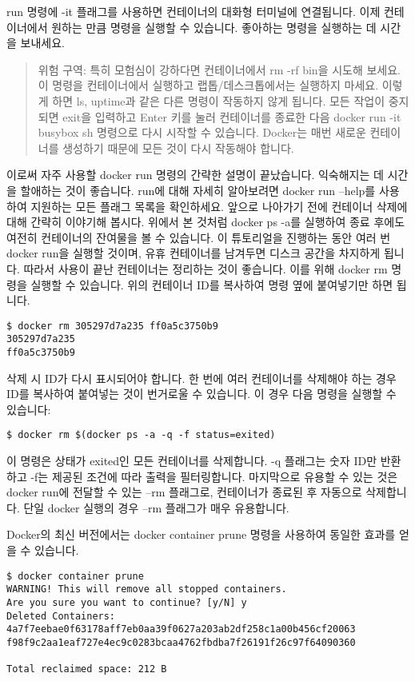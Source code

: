 run 명령에 -it 플래그를 사용하면 컨테이너의 대화형 터미널에 연결됩니다. 이제 컨테이너에서 원하는 만큼 명령을 실행할 수 있습니다. 좋아하는 명령을 실행하는 데 시간을 보내세요.
\begin{quote}
위험 구역: 특히 모험심이 강하다면 컨테이너에서 rm -rf bin을 시도해 보세요. 이 명령을 컨테이너에서 실행하고 랩톱/데스크톱에서는 실행하지 마세요. 이렇게 하면 ls, uptime과 같은 다른 명령이 작동하지 않게 됩니다. 모든 작업이 중지되면 exit을 입력하고 Enter 키를 눌러 컨테이너를 종료한 다음 docker run -it busybox sh 명령으로 다시 시작할 수 있습니다. Docker는 매번 새로운 컨테이너를 생성하기 때문에 모든 것이 다시 작동해야 합니다.
\end{quote}

이로써 자주 사용할 docker run 명령의 간략한 설명이 끝났습니다. 익숙해지는 데 시간을 할애하는 것이 좋습니다. run에 대해 자세히 알아보려면 docker run --help를 사용하여 지원하는 모든 플래그 목록을 확인하세요. 앞으로 나아가기 전에 컨테이너 삭제에 대해 간략히 이야기해 봅시다. 위에서 본 것처럼 docker ps -a를 실행하여 종료 후에도 여전히 컨테이너의 잔여물을 볼 수 있습니다. 이 튜토리얼을 진행하는 동안 여러 번 docker run을 실행할 것이며, 유휴 컨테이너를 남겨두면 디스크 공간을 차지하게 됩니다. 따라서 사용이 끝난 컨테이너는 정리하는 것이 좋습니다. 이를 위해 docker rm 명령을 실행할 수 있습니다. 위의 컨테이너 ID를 복사하여 명령 옆에 붙여넣기만 하면 됩니다.
\begin{lstlisting}[language=Shell]
$ docker rm 305297d7a235 ff0a5c3750b9
305297d7a235
ff0a5c3750b9
\end{lstlisting}

삭제 시 ID가 다시 표시되어야 합니다. 한 번에 여러 컨테이너를 삭제해야 하는 경우 ID를 복사하여 붙여넣는 것이 번거로울 수 있습니다. 이 경우 다음 명령을 실행할 수 있습니다:
\begin{lstlisting}[language=Shell]
$ docker rm $(docker ps -a -q -f status=exited)
\end{lstlisting}

이 명령은 상태가 exited인 모든 컨테이너를 삭제합니다. -q 플래그는 숫자 ID만 반환하고 -f는 제공된 조건에 따라 출력을 필터링합니다. 마지막으로 유용할 수 있는 것은 docker run에 전달할 수 있는 --rm 플래그로, 컨테이너가 종료된 후 자동으로 삭제합니다. 단일 docker 실행의 경우 --rm 플래그가 매우 유용합니다.

Docker의 최신 버전에서는 docker container prune 명령을 사용하여 동일한 효과를 얻을 수 있습니다.
\begin{lstlisting}[language=Shell]
$ docker container prune
WARNING! This will remove all stopped containers.
Are you sure you want to continue? [y/N] y
Deleted Containers:
4a7f7eebae0f63178aff7eb0aa39f0627a203ab2df258c1a00b456cf20063
f98f9c2aa1eaf727e4ec9c0283bcaa4762fbdba7f26191f26c97f64090360

Total reclaimed space: 212 B
\end{lstlisting}

